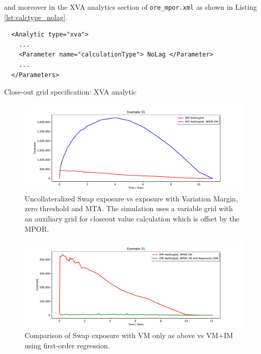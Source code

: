 and moreover in the XVA analytics section of {\tt ore\_mpor.xml} as shown in Listing \ref{lst:calctype_nolag}.

\begin{listing}[H]
\begin{verbatim}
  <Analytic type="xva">
    ...
    <Parameter name="calculationType"> NoLag </Parameter>
    ...
  </Parameters>
\end{verbatim}
\caption{Close-out grid specification: XVA analytic}
\label{lst:calctype_nolag}
\end{listing}

\begin{figure}[h!]
\begin{center}
\includegraphics[scale=0.45]{examples/mpl_closeout_mpor_epe.pdf}
\end{center}
\caption{Uncollateralized Swap exposure vs exposure with Variation Margin, zero threshold and MTA.
  The simulation uses a variable grid with an auxiliary grid for closeout value calculation which is offset by the MPOR.}
\label{fig_31_a}
\end{figure}

\begin{figure}[h!]
\begin{center}
\includegraphics[scale=0.45]{examples/mpl_closeout_dim_epe.pdf}
\end{center}
\caption{Comparison of Swap exposure with VM only as above vs VM+IM using first-order regression.}
\label{fig_31_b}
\end{figure}

